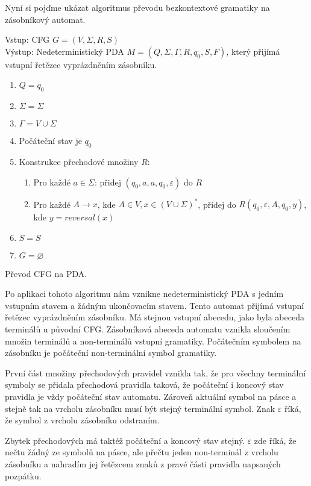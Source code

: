 Nyní si pojďme ukázat algoritmus převodu bezkontextové gramatiky na zásobníkový automat. \cite{CFG_to_PDA}

\begin{framed}
	Vstup: CFG \(G = (V,\Sigma, R, S) \)\\
	Výstup: Nedeterministický PDA \(M = (Q, \Sigma, \Gamma, R, q_0, S, F) \), který přijímá vstupní řetězec vyprázdněním zásobníku. 
	\begin{enumerate}
		\item \(Q = {q_0}\)
		\item \(\Sigma = \Sigma\)
		\item \(\Gamma = V \cup \Sigma \)
		\item Počáteční stav je \(q_0\)
		\item Konstrukce přechodové množiny \( R \):
		\begin{enumerate}
			\item Pro každé $a \in \Sigma$: přidej $(q_0,a,a,q_0,\varepsilon)$ do $R$
			\item Pro každé $A \rightarrow x$, kde $A \in V, x \in (V \cup \Sigma)^*$, přidej do $R (q_0, \varepsilon, A, q_0, y)$, 
			kde $y = reversal(x)$
		\end{enumerate}
		\item \(S = S\)
		\item $G = \varnothing$
	\end{enumerate}
\end{framed}
\begin{myAlgorithm}
	Převod CFG na PDA.
\end{myAlgorithm}

Po aplikaci tohoto algoritmu nám vznikne nedeterministický PDA s jedním vstupním stavem a žádným ukončovacím stavem. Tento automat přijímá vstupní řetězec vyprázdněním zásobníku. Má stejnou vstupní abecedu, jako byla abeceda terminálů u původní CFG. Zásobníková abeceda automatu vznikla sloučením množin terminálů a non-terminálů vstupní gramatiky. Počátečním symbolem na zásobníku je počáteční non-terminální symbol gramatiky. 

První část množiny přechodových pravidel vznikla tak, že pro všechny terminální symboly se přidala přechodová pravidla taková, že počáteční i koncový stav pravidla je vždy počáteční stav automatu. Zároveň aktuální symbol na pásce a stejně tak na vrcholu zásobníku musí být stejný terminální symbol. Znak $\varepsilon$ říká, že symbol z vrcholu zásobníku odstraním. 

Zbytek přechodových má taktéž počáteční a koncový stav stejný. $\varepsilon$ zde říká, že nečtu žádný ze symbolů na pásce, ale přečtu jeden non-terminál z vrcholu zásobníku a nahradím jej řetězcem znaků z pravé části pravidla napsaných pozpátku.  

